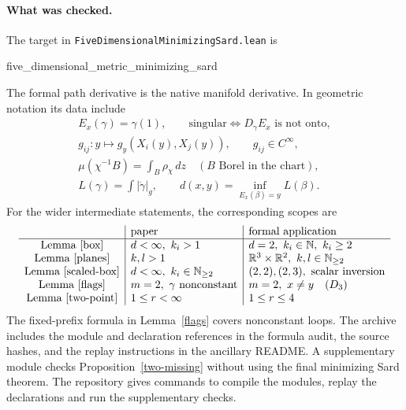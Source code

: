 \documentclass[11pt,letterpaper]{article}
\newcommand{\R}{\mathbb R}
\begin{document}
\paragraph{What was checked.}
The target in \texttt{FiveDimensionalMinimizingSard.lean} is
\begin{center}\small\ttfamily five\_dimensional\_metric\_minimizing\_sard\end{center}
The formal path derivative is the native manifold derivative. In geometric
notation its data include
\[
 \begin{gathered}
 E_x(\gamma)=\gamma(1),\qquad
 \text{singular}\iff D_\gamma E_x\text{ is not onto},\\
 g_{ij}:y\mapsto g_y(X_i(y),X_j(y)),\qquad g_{ij}\in C^\infty,\\
 \mu(\chi^{-1}B)=\int_B\rho_\chi\,dz\quad(B\text{ Borel in the chart}),\\
 L(\gamma)=\int|\dot\gamma|_g,\qquad d(x,y)=\inf_{E_x(\beta)=y}L(\beta).
 \end{gathered}
\]
For the wider intermediate statements, the corresponding scopes are
\[
 \begin{array}{c|l|l}
  &\text{paper}&\text{formal application}\\ \hline
 \text{Lemma~\ref{box}} & d<\infty,\ k_i>1 &d=2,\ k_i\in\mathbb N,\ k_i\ge2\\
 \text{Lemma~\ref{planes}} & k,l>1&\R^3\times\R^2,\ k,l\in\mathbb N_{\ge2}\\
 \text{Lemma~\ref{scaled-box}} &d<\infty,\ k_i\in\mathbb N_{\ge2}
       &(2,2),(2,3),\ \text{scalar inversion}\\
 \text{Lemma~\ref{flags}} & m=2,\ \gamma\text{ nonconstant}
       &m=2,\ x\ne y\quad(D_3)\\
 \text{Lemma~\ref{two-point}} &1\le r<\infty &1\le r\le4
 \end{array}
\]
The fixed-prefix formula in Lemma~\ref{flags} covers nonconstant loops.
The archive includes the module and declaration references in the formula
audit, the source hashes, and the replay instructions in the ancillary README.
A supplementary module checks Proposition~\ref{two-missing} without using
the final minimizing Sard theorem. The repository gives commands to compile
the modules, replay the declarations and run the supplementary checks.
\end{document}
